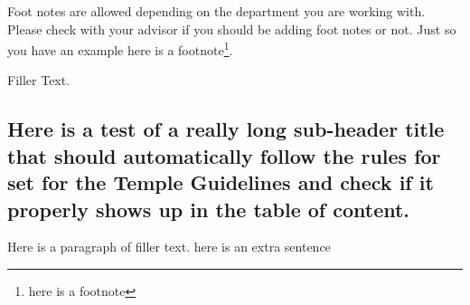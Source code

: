 Foot notes are allowed depending on the department you are working with. Please check with your advisor if you should be adding foot notes or not. Just so you have an example here is a footnote\footnote{here is a footnote}.



Filler Text. \lipsum[4]

\subsection{Here is a test of a really long sub-header title that should automatically follow the rules for set for the Temple Guidelines and check if it properly shows up in the table of content. }

Here is a paragraph of filler text. \lipsum[2]
here is an extra sentence